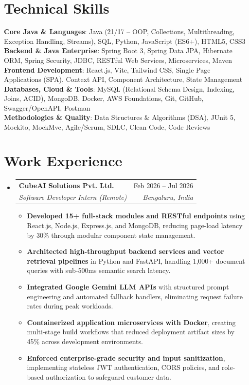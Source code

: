 \documentclass[letterpaper,10pt]{article}
\makeatletter
\newcommand{\resumeItem}[1]{
  \item\small{
    {#1 \vspace{-2pt}}
  }
}
\newcommand{\resumeSubheading}[4]{
  \vspace{-2pt}\item
    \begin{tabular*}{0.98\textwidth}[t]{l@{\extracolsep{\fill}}r}
      \textbf{#1} & #2 \\
      \textit{\small#3} & \textit{\small #4} \\
    \end{tabular*}\vspace{-4pt}
}
\newcommand{\resumeSubHeadingListStart}{\begin{itemize}[leftmargin=0.15in, label={}]}
\newcommand{\resumeSubHeadingListEnd}{\end{itemize}}
\newcommand{\resumeItemListStart}{\begin{itemize}[leftmargin=0.15in]}
\newcommand{\resumeItemListEnd}{\end{itemize}\vspace{-4pt}}
\makeatother
\begin{document}
\section{Technical Skills}
 \begin{itemize}[leftmargin=0.15in, label={}]
    \small{\item{
     \textbf{Core Java \& Languages}{: Java (21/17 -- OOP, Collections, Multithreading, Exception Handling, Streams), SQL, Python, JavaScript (ES6+), HTML5, CSS3} \\ \vspace{1pt}
     \textbf{Backend \& Java Enterprise}{: Spring Boot 3, Spring Data JPA, Hibernate ORM, Spring Security, JDBC, RESTful Web Services, Microservices, Maven} \\ \vspace{1pt}
     \textbf{Frontend Development}{: React.js, Vite, Tailwind CSS, Single Page Applications (SPA), Context API, Component Architecture, State Management} \\ \vspace{1pt}
     \textbf{Databases, Cloud \& Tools}{: MySQL (Relational Schema Design, Indexing, Joins, ACID), MongoDB, Docker, AWS Foundations, Git, GitHub, Swagger/OpenAPI, Postman} \\ \vspace{1pt}
     \textbf{Methodologies \& Quality}{: Data Structures \& Algorithms (DSA), JUnit 5, Mockito, MockMvc, Agile/Scrum, SDLC, Clean Code, Code Reviews}
    }}
 \end{itemize}
\vspace{-10pt}

\section{Work Experience}
  \resumeSubHeadingListStart
    \resumeSubheading
      {CubeAI Solutions Pvt. Ltd.}{Feb 2026 -- Jul 2026}
      {Software Developer Intern (Remote)}{Bengaluru, India}
      \resumeItemListStart
        \resumeItem{\textbf{Developed 15+ full-stack modules and RESTful endpoints} using React.js, Node.js, Express.js, and MongoDB, reducing page-load latency by 30\% through modular component state management.}
        \resumeItem{\textbf{Architected high-throughput backend services and vector retrieval pipelines} in Python and FastAPI, handling 1,000+ document queries with sub-500ms semantic search latency.}
        \resumeItem{\textbf{Integrated Google Gemini LLM APIs} with structured prompt engineering and automated fallback handlers, eliminating request failure rates during peak workloads.}
        \resumeItem{\textbf{Containerized application microservices with Docker}, creating multi-stage build workflows that reduced deployment artifact sizes by 45\% across development environments.}
        \resumeItem{\textbf{Enforced enterprise-grade security and input sanitization}, implementing stateless JWT authentication, CORS policies, and role-based authorization to safeguard customer data.}
      \resumeItemListEnd
  \resumeSubHeadingListEnd
\vspace{-6pt}
\end{document}
